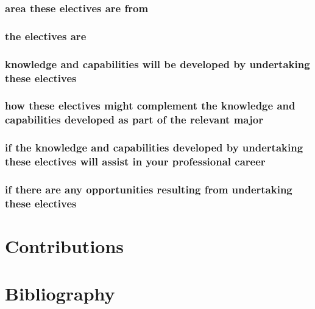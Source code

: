 \documentclass{article}
\begin{document}
		\subsubsection{area these electives are from}
		\subsubsection{the electives are}
		\subsubsection{knowledge and capabilities will be developed by undertaking these electives} 
		\subsubsection{how these electives might complement the knowledge and capabilities developed as part of the relevant major}
		\subsubsection{if the knowledge and capabilities developed by undertaking these electives will assist in your professional career}
		\subsubsection{if there are any opportunities resulting from undertaking these electives}
		\pagebreak

\section{Contributions}
	\pagebreak

\section{Bibliography}
	\nocite{*}
	
	
\end{document}
